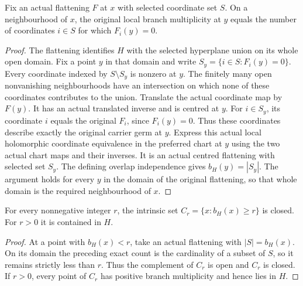 \begin{lemma}
\label{hir:general-nc-exact-nearby-branch-count}
\leanok
Fix an actual flattening $F$ at $x$ with selected coordinate set $S$.
On a neighbourhood of $x$, the original local branch multiplicity at
$y$ equals the number of coordinates $i\in S$ for which $F_i(y)=0$.
\end{lemma}
\begin{proof}
The flattening identifies $H$ with the selected hyperplane union on its
whole open domain. Fix a point $y$ in that domain and write
$S_y=\{i\in S:F_i(y)=0\}$. Every coordinate indexed by $S\setminus S_y$
is nonzero at $y$. The finitely many open nonvanishing neighbourhoods
have an intersection on which none of these coordinates contributes
to the union. Translate the actual coordinate map by $F(y)$. It has
an actual translated inverse and is centred at $y$. For $i\in S_y$,
its coordinate $i$ equals the original $F_i$, since $F_i(y)=0$.
Thus these coordinates describe exactly the original carrier germ at
$y$. Express this actual local holomorphic coordinate equivalence in
the preferred chart at $y$ using the two actual chart maps and their
inverses. It is an actual centred flattening with selected set $S_y$.
The defining overlap independence gives $b_H(y)=|S_y|$. The argument
holds for every $y$ in the domain of the original flattening, so that
whole domain is the required neighbourhood of $x$.
\end{proof}

\begin{lemma}
\label{hir:general-nc-closed-multiplicity-superlevels}
\leanok
For every nonnegative integer $r$, the intrinsic set
$C_r=\{x:b_H(x)\ge r\}$ is closed. For $r>0$ it is contained in $H$.
\end{lemma}
\begin{proof}
At a point with $b_H(x)<r$, take an actual flattening with
$|S|=b_H(x)$. On its domain the preceding exact count is the cardinality
of a subset of $S$, so it remains strictly less than $r$. Thus the
complement of $C_r$ is open and $C_r$ is closed. If $r>0$, every
point of $C_r$ has positive branch multiplicity and hence lies in $H$.
\end{proof}

